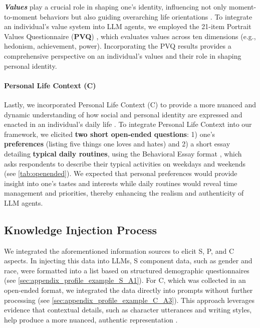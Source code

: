 \textbf{\textit{Values}} play a crucial role in shaping one's identity, influencing not only moment-to-moment behaviors but also guiding overarching life orientations \citep{schwartz1994there}. To integrate an individual’s value system into LLM agents, we employed the 21-item Portrait Values Questionnaire (\textbf{PVQ}) \citep{schwartzpvq2009basic}, which evaluates values across ten dimensions (e.g., hedonism, achievement, power). Incorporating the PVQ results provides a comprehensive perspective on an individual's values and their role in shaping personal identity.

\paragraph{Personal Life Context (C)}
Lastly, we incorporated Personal Life Context (C) to provide a more nuanced and dynamic understanding of how social and personal identity are expressed and enacted in an individual's daily life \cite{chen_meta-analysis_2024, frederickx2014role, schwartz1994there}.
To integrate Personal Life Context into our framework, we elicited \textbf{two short open-ended questions}: 1) one's \textbf{preferences} (listing five things one loves and hates) and 2) a short essay detailing \textbf{typical daily routines}, using the Behavioral Essay format \citep{boyd_values_2021}, which asks respondents to describe their typical activities on weekdays and weekends (see \ref{tab:openended}).
We expected that personal preferences would provide insight into one's tastes and interests while daily routines would reveal time management and priorities, thereby enhancing the realism and authenticity of LLM agents.

\subsection{Knowledge Injection Process}
\label{sec:knowledge_injection_pipieline}

We integrated the aforementioned information sources to elicit S, P, and C aspects. In injecting this data into LLMs, S component data, such as gender and race, were formatted into a list based on structured demographic questionnaires (see \ref{sec:appendix_profile_example_S_A1}). For C, which was collected in an open-ended format, we integrated the data directly into prompts without further processing (see \ref{sec:appendix_profile_example_C_A3}). This approach leverages evidence that contextual details, such as character utterances and writing styles, help produce a more nuanced, authentic representation \citep{han_meet_2022, ahn_mpchat_2023, shao_character-llm_2023}.

